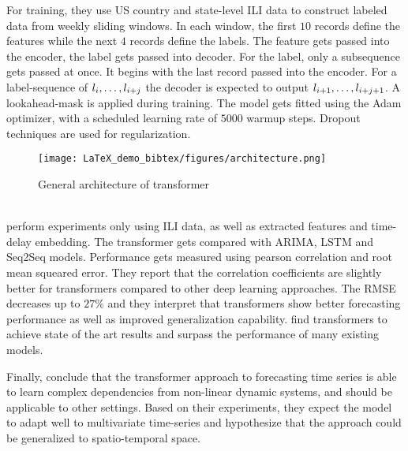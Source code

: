 \documentclass[11pt,a4paper]{article}
\begin{document}
For training, they use US country and state-level ILI data to construct labeled data from weekly sliding windows.
In each window, the first $10$ records define the features while the next $4$ records define the labels.
The feature gets passed into the encoder, the label gets passed into decoder.
For the label, only a subsequence gets passed at once.
It begins with the last record passed into the encoder.
For a label-sequence of $l_i,\mathellipsis,l_{i+j}$ the decoder is expected to output $l_{i+1},\mathellipsis,l_{i+j+1}$.
A lookahead-mask is applied during training.
The model gets fitted using the Adam optimizer, with a scheduled learning rate of $5000$ warmup steps. %
Dropout techniques are used for regularization.
\begin{figure}%
    \centering
    \texttt{[image: LaTeX\_demo\_bibtex/figures/architecture.png]}
    \caption{General architecture of transformer}
    \label{fig:architecture}
\end{figure}
~\\
\citet{wu_2020} perform experiments only using ILI data, as well as extracted features and time-delay embedding.
The transformer gets compared with ARIMA, LSTM and Seq2Seq models. %
Performance gets measured using pearson correlation and root mean squeared error.
They report that the correlation coefficients are slightly better for transformers compared to other deep learning approaches.
The RMSE decreases up to $27\%$ and they interpret that transformers show better forecasting performance as well as improved generalization capability.
find transformers to achieve state of the art results and surpass the performance of many existing models.

Finally, \citet{wu_2020} conclude that the transformer approach to forecasting time series is able to learn complex dependencies from non-linear dynamic systems, and should be applicable to other settings.
Based on their experiments, they expect the model to adapt well to multivariate time-series and hypothesize that the approach could be generalized to spatio-temporal space.
\end{document}
